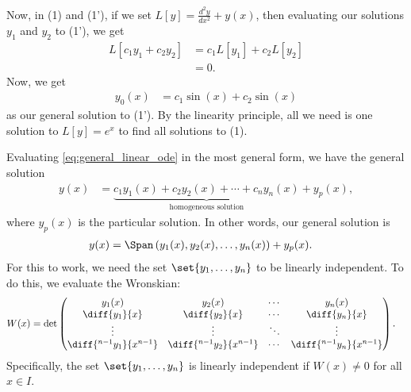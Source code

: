 \documentclass[10pt]{mypackage}
\begin{document}
Now, in (1) and (1'), if we set $L\left[y\right] = \frac{d^2y}{dx^2} + y(x)$, then evaluating our solutions $y_1$ and $y_2$ to (1'), we get
\begin{align*}
  L\left[c_1y_1 + c_2y_2\right] &= c_1L\left[y_1\right] + c_2L\left[y_2\right]\\
                                &= 0.
\end{align*}
Now, we get
\begin{align*}
  y_0(x) &= c_1\sin(x) + c_2\sin(x)
\end{align*}
as our general solution to (1'). By the linearity principle, all we need is one solution to $L\left[y\right] = e^x$ to find all solutions to (1).\newline

Evaluating \eqref{eq:general_linear_ode} in the most general form, we have the general solution
\begin{align*}
  y(x) &= \underbrace{c_1y_1(x) + c_2y_2(x) + \cdots + c_ny_n(x)}_{\text{homogeneous solution}} + y_p(x),
\end{align*}
where $y_p(x)$ is the particular solution. In other words, our general solution is
\begin{align*}
  y(x) &= \Span\left(y_1(x),y_2(x),\dots,y_n(x)\right) + y_p(x).
\end{align*}
For this to work, we need the set $\set{y_1,\dots,y_n}$ to be linearly independent. To do this, we evaluate the Wronskian:
{
  \begin{align*}
    W(x) &= \det \begin{pmatrix}y_1(x) & y_2(x) & \cdots & y_n(x) \\ \diff{y_1}{x}& \diff{y_2}{x} & \cdots & \diff{y_n}{x} \\ \vdots & \vdots & \ddots & \vdots \\ \diff{^{n-1}y_1}{x^{n-1}} & \diff{^{n-1}y_2}{x^{n-1}} & \cdots & \diff{^{n-1}y_n}{x^{n-1}}\end{pmatrix}.
\end{align*}
}
Specifically, the set $\set{y_1,\dots,y_n}$ is linearly independent if $W(x)\neq 0$ for all $x\in I$.
\end{document}
